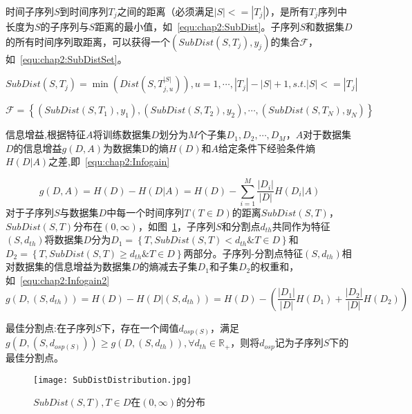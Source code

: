\begin{definition}
\label{def:chap2:SubDist}
	时间子序列$S$到时间序列$T_j$之间的距离（必须满足$|S|<=|T_j|$），是所有$T_j$序列中长度为$S$的子序列与$S$距离的最小值，如~\ref{equ:chap2:SubDist}。子序列$S$和数据集$D$的所有时间序列取距离，可以获得一个$(SubDist(S,T_j),y_j)$的集合$\mathcal{F}$，如~\ref{equ:chap2:SubDistSet}。
\end{definition}
\begin{equation}
\label{equ:chap2:SubDist}
	SubDist(S,T_j) = \min (Dist(S,T_{j,u}^{|S|})),u=1,\cdots,|T_j|-|S|+1,s.t. |S| <= |T_j|
\end{equation}

{}

{}



\begin{equation}
\label{equ:chap2:SubDistSet}
	\mathcal{F} = \left\lbrace (SubDist(S,T_1),y_1),(SubDist(S,T_2),y_2),\cdots,(SubDist(S,T_N),y_N) \right\rbrace 
\end{equation}

\begin{definition}
	信息增益,根据特征$A$将训练数据集$D$划分为$M$个子集$D_1,D_2,\cdots,D_M$，$A$对于数据集$D$的信息增益$g(D,A)$为数据集D的熵$H(D)$和$A$给定条件下经验条件熵$H(D|A)$之差,即~\ref{equ:chap2:Infogain}
\end{definition}
\begin{equation}
\label{equ:chap2:Infogain}
g(D,A) = H(D) - H(D|A) = H(D) - \sum_{i=1}^{M}\frac{|D_i|}{|D|}H(D_i|A)
\end{equation}
	对于子序列$S$与数据集$D$中每一个时间序列$T(T\in D)$的距离$SubDist(S,T)$，$SubDist(S,T)$分布在$(0,\infty)$，如图~\ref{fig:SubDist}，子序列$S$和分割点$d_{th}$共同作为特征$(S,d_{th})$将数据集$D$分为$D_1 = \left\lbrace T,SubDist(S,T)<d_{th} \& T\in D\right\rbrace $和$D_2 = \left\lbrace T,SubDist(S,T) \geq d_{th}\& T\in D\right\rbrace$两部分。子序列-分割点特征$(S,d_{th})$相对数据集的信息增益为数据集$D$的熵减去子集$D_1$和子集$D_2$的权重和，如~\ref{equ:chap2:Infogain2}
\begin{equation}
\label{equ:chap2:Infogain2}
g(D,(S,d_{th})) =H(D)-H(D|(S,d_{th})) = H(D)-(\frac{|D_1|}{|D|}H(D_1)+\frac{|D_2|}{|D|}H(D_2))
\end{equation}
\begin{definition}
	最佳分割点:在子序列$S$下，存在一个阈值$d_{osp(S)}$，满足$g(D,(S,d_{osp(S)})) \geq g(D,(S,d_{th})),\forall d_{th}\in \mathbb{R}_{+}$，则将$d_{osp}$记为子序列$S$下的最佳分割点。
\end{definition}
\begin{figure}[H] %
	\centering
	\texttt{[image: SubDistDistribution.jpg]}
	\caption{$SubDist(S,T),T\in D$在$(0,\infty)$的分布}
	\label{fig:SubDist}
\end{figure}

